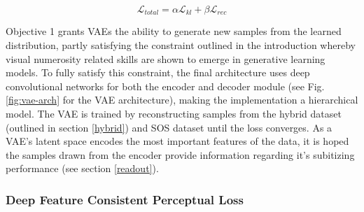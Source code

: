 \documentclass[twocolumn]{article}
\begin{document}
\[\mathcal{L}_{total} = \alpha\mathcal{L}_{kl} + \beta\mathcal{L}_{rec} \tag{1}\]

\noindent Objective 1 grants VAEs the ability to generate new samples
from the learned distribution, partly satisfying the constraint outlined
in the introduction whereby visual numerosity related skills are shown to emerge in
generative learning models. To fully satisfy this constraint, the final
architecture uses deep convolutional networks for both the encoder and decoder
module (see Fig. \ref{fig:vae-arch} for the VAE architecture), making the
implementation a hierarchical model. The VAE is trained by reconstructing samples from the hybrid dataset (outlined in section \ref{hybrid}) and SOS dataset until the loss converges. As a VAE's latent space
encodes the most important features of the data, it is hoped the samples
drawn from the encoder provide information regarding it's subitizing
performance (see section \ref{readout}). 

\hypertarget{deep-feature-consistent-perceptual-loss}{%
\subsubsection{Deep Feature Consistent Perceptual
Loss}\label{deep-feature-consistent-perceptual-loss}}
\end{document}
